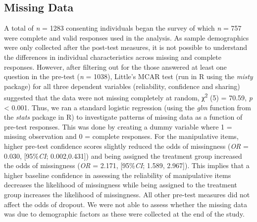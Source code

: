 \documentclass[empirical, authordate, issue]{jote-new-article}
\begin{document}
\subsection{Missing Data}
A total of \emph{n} = 1283 consenting individuals began the survey of which \emph{n} = 757 were complete and valid responses used in the analysis. As sample demographics were only collected after the post-test measures, it is not possible to understand the differences in individual characteristics across missing and complete responses. However, after filtering out for the those answered at least one question in the pre-test (\emph{n} = 1038), Little's MCAR test (run in R using the \emph{misty }package) for all three dependent variables (reliability, confidence and sharing) suggested that the data were not missing completely at random, χ\textsuperscript{2} (5) = 70.59, \emph{p }< 0.001. Thus, we ran a standard logistic regression (using the \emph{glm }function from the \emph{stats} package in R) to investigate patterns of missing data as a function of pre-test responses. This was done by creating a dummy variable where 1 = missing observation and 0 = complete responses. For the manipulative items, higher pre-test confidence scores slightly reduced the odds of missingness (\emph{OR} = 0.030, [95\%\emph{CI}; 0.002,0.431]) and being assigned the treatment group increased the odds of missingness (\emph{OR} = 2.171, [95\%\emph{CI}; 1.589, 2.967]). This implies that a higher baseline confidence in assessing the reliability of manipulative items decreases the likelihood of missingness while being assigned to the treatment group increases the likelihood of missingness. All other pre-test measures did not affect the odds of dropout. We were not able to assess whether the missing data was due to demographic factors as these were collected at the end of the study.
\end{document}
